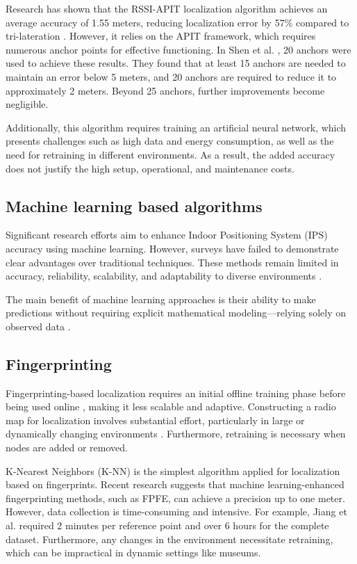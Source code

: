 Research has shown that the RSSI-APIT localization algorithm achieves an average accuracy of 1.55 meters, reducing localization error by 57\% compared to tri-lateration \cite{shen_indoor_2023}. However, it relies on the APIT framework, which requires numerous anchor points for effective functioning. In Shen et al. \cite{shen_indoor_2023}, 20 anchors were used to achieve these results. They found that at least 15 anchors are needed to maintain an error below 5 meters, and 20 anchors are required to reduce it to approximately 2 meters. Beyond 25 anchors, further improvements become negligible.   

Additionally, this algorithm requires training an artificial neural network, which presents challenges such as high data and energy consumption, as well as the need for retraining in different environments. As a result, the added accuracy does not justify the high setup, operational, and maintenance costs. 

\subsection{Machine learning based algorithms}

Significant research efforts aim to enhance Indoor Positioning System (IPS) accuracy using machine learning. However, surveys have failed to demonstrate clear advantages over traditional techniques. These methods remain limited in accuracy, reliability, scalability, and adaptability to diverse environments \cite{nessa_survey_2020}.   

The main benefit of machine learning approaches is their ability to make predictions without requiring explicit mathematical modeling—relying solely on observed data \cite{nessa_survey_2020}.

\subsection{Fingerprinting}

Fingerprinting-based localization requires an initial offline training phase before being used online \cite{nessa_survey_2020}, making it less scalable and adaptive. Constructing a radio map for localization involves substantial effort, particularly in large or dynamically changing environments \cite{nessa_survey_2020}. Furthermore, retraining is necessary when nodes are added or removed.   

K-Nearest Neighbors (K-NN) is the simplest algorithm applied for localization based on fingerprints. Recent research suggests that machine learning-enhanced fingerprinting methods, such as FPFE, can achieve a precision up to one meter. However, data collection is time-consuming and intensive. For example, Jiang et al. \cite{jiang_fingerprint_2021} required 2 minutes per reference point and over 6 hours for the complete dataset. Furthermore, any changes in the environment necessitate retraining, which can be impractical in dynamic settings like museums.

